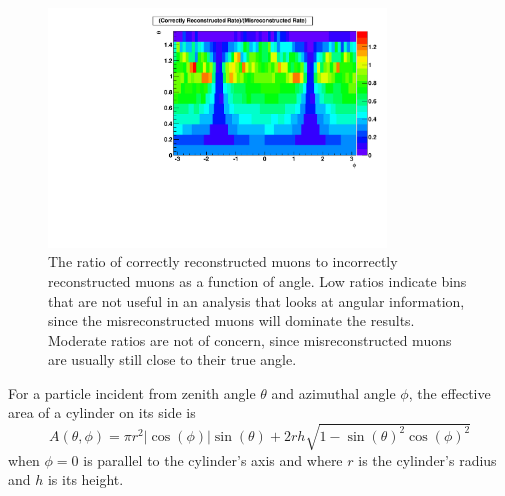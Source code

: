\documentclass[herrin-thesis.tex]{subfiles}
\begin{document}
 \begin{figure}[htpb]
 \centering
 \includegraphics[width=0.8\textwidth]{./plots/muon_correct_ratio.pdf}
 \caption[Ratio of correct to incorrect reconstructions]{The ratio of correctly reconstructed muons to incorrectly reconstructed muons as a function of angle. Low ratios indicate bins that are not useful in an analysis that looks at angular information, since the misreconstructed muons will dominate the results. Moderate ratios are not of concern, since misreconstructed muons are usually still close to their true angle.}
 \label{fig:muon_correct_ratio}
 \end{figure}

For a particle incident from zenith angle \(\theta\) and azimuthal angle \(\phi\), the effective area of a cylinder on its side is
\begin{equation}
A(\theta,\phi) = \pi r^2 |\cos(\phi)|\sin(\theta) + 2 r h \sqrt{1-\sin(\theta)^2 \cos(\phi)^2}
\end{equation}
when \(\phi=0\) is parallel to the cylinder's axis and where \(r\) is the cylinder's radius and \(h\) is its height.
\end{document}
